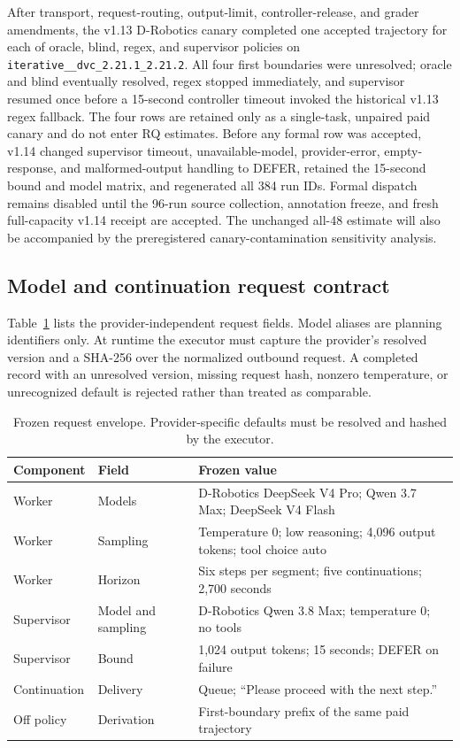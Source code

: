 After transport, request-routing, output-limit, controller-release, and grader amendments, the v1.13 D-Robotics canary completed one accepted trajectory for each of oracle, blind, regex, and supervisor policies on \texttt{iterative\_\_dvc\_2.21.1\_2.21.2}. All four first boundaries were unresolved; oracle and blind eventually resolved, regex stopped immediately, and supervisor resumed once before a 15-second controller timeout invoked the historical v1.13 regex fallback. The four rows are retained only as a single-task, unpaired paid canary and do not enter RQ estimates. Before any formal row was accepted, v1.14 changed supervisor timeout, unavailable-model, provider-error, empty-response, and malformed-output handling to DEFER, retained the 15-second bound and model matrix, and regenerated all 384 run IDs. Formal dispatch remains disabled until the 96-run source collection, annotation freeze, and fresh full-capacity v1.14 receipt are accepted. The unchanged all-48 estimate will also be accompanied by the preregistered canary-contamination sensitivity analysis.

\subsection{Model and continuation request contract}

Table~\ref{tab:request-contract} lists the provider-independent request fields. Model aliases are planning identifiers only. At runtime the executor must capture the provider's resolved version and a SHA-256 over the normalized outbound request. A completed record with an unresolved version, missing request hash, nonzero temperature, or unrecognized default is rejected rather than treated as comparable.

\begin{table}[t]
  \caption{Frozen request envelope. Provider-specific defaults must be resolved and hashed by the executor.}
  \label{tab:request-contract}
  \centering
  \begin{tabular}{p{}p{}p{}}
    \toprule
    Component & Field & Frozen value \\
    \midrule
    Worker & Models & D-Robotics DeepSeek V4 Pro; Qwen 3.7 Max; DeepSeek V4 Flash \\
    Worker & Sampling & Temperature 0; low reasoning; 4,096 output tokens; tool choice auto \\
    Worker & Horizon & Six steps per segment; five continuations; 2,700 seconds \\
    Supervisor & Model and sampling & D-Robotics Qwen 3.8 Max; temperature 0; no tools \\
    Supervisor & Bound & 1,024 output tokens; 15 seconds; DEFER on failure \\
    Continuation & Delivery & Queue; ``Please proceed with the next step.'' \\
    Off policy & Derivation & First-boundary prefix of the same paid trajectory \\
    \bottomrule
  \end{tabular}
\end{table}

